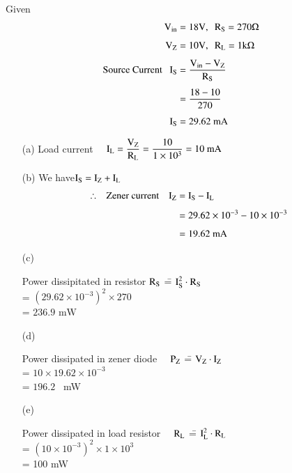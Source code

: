 \begin{solution}
Given
\begin{align*}
\textrm{V}_{\text{in}} &= 18\textrm{V}, \ \ \textrm{R}_{\textrm{S}}=270\Omega\\[4pt]
\textrm{V}_{\textrm{Z}} &= 10\textrm{V}, \ \ \textrm{R}_{\textrm{L}}=1\textrm{k}\Omega\\[4pt]
\text{Source Current~~ } \textrm{I}_{\textrm{S}} &= \dfrac{\textrm{V}_{\text{in}}-\textrm{V}_{\textrm{Z}}}{\textrm{R}_{\textrm{S}}}\\[4pt]
&= \frac{18-10}{270}\\[4pt]
\textrm{I}_{\textrm{S}} &= 29.62\text{~mA}
\end{align*}
\begin{itemize}
\item[(a)] Load current \ \ $\textrm{I}_{\textrm{L}}=\dfrac{\textrm{V}_{\textrm{Z}}}{\textrm{R}_{\textrm{L}}}=\dfrac{10}{1\times 10^{3}}=10\text{~mA}$

\item[(b)] We have\quad $\textrm{I}_{\textrm{S}}=\textrm{I}_{\textrm{Z}}+\textrm{I}_{\textrm{L}}$
\begin{align*}
\therefore~ \text{~ Zener current}\quad \textrm{I}_{\textrm{Z}} &= \textrm{I}_{\textrm{S}}-\textrm{I}_{\textrm{L}}\\[4pt]
          &= 29.62\times 10^{-3}-10\times 10^{-3}\\[4pt]
          &= 19.62\text{~mA}
\end{align*}

\item[(c)] 
\begin{tabbing}
Power dissipitated in resistor $\textrm{R}_{\textrm{S}}$ \== $\textrm{I}_{\textrm{S}}^{2}\cdot \textrm{R}_{\textrm{S}}$\\[6pt]
          \>= $(29.62\times 10^{-3})^{2}\times 270$\\[6pt]
          \>= $236.9\text{~mW}$
\end{tabbing}

\item[(d)]
\begin{tabbing}
Power dissipated in zener diode~~ $\textrm{P}_{\textrm{Z}}$ \== $\textrm{V}_{\textrm{Z}}\cdot \textrm{I}_{\textrm{Z}}$\\[6pt]
    \>= $10\times 19.62\times 10^{-3}$\\[6pt]
    \>= $196.2$~ mW
\end{tabbing}

\item[(e)]
\begin{tabbing}
Power dissipated in load resistor~~ $\textrm{R}_{\textrm{L}}$ \== $\textrm{I}_{\textrm{L}}^{2}\cdot \textrm{R}_{\textrm{L}}$\\[6pt]
 \>= $(10\times 10^{-3})^{2}\times 1\times 10^{3}$\\[6pt]
 \>= 100 mW
\end{tabbing}
\end{itemize}
\end{solution}

